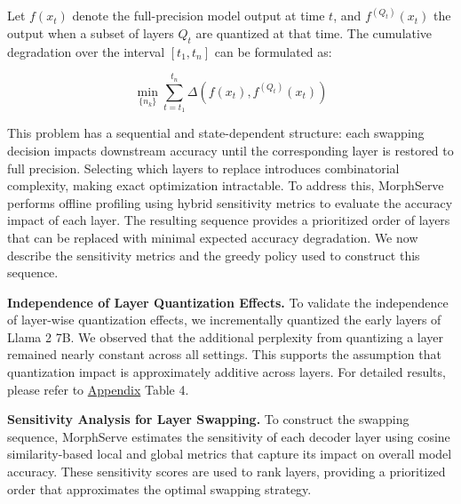 \documentclass{article}
\newcommand{\system}{{MorphServe}\xspace}
\begin{document}
Let $f(x_t)$ denote the full-precision model output at time $t$, and $f^{(Q_t)}(x_t)$ the output when a subset of layers $Q_t$ are quantized at that time. The cumulative degradation over the interval $[t_1, t_n]$ can be formulated as: \vspace{-20pt}

\begin{equation}
\min_{\{n_k\}} \sum_{t = t_1}^{t_n} \Delta(f(x_t), f^{(Q_t)}(x_t))
\label{eq:objective}
\end{equation}

This problem has a sequential and state-dependent structure: each swapping decision impacts downstream accuracy until the corresponding layer is restored to full precision. Selecting which layers to replace introduces combinatorial complexity, making exact optimization intractable. To address this, {\system} performs offline profiling using hybrid sensitivity metrics to evaluate the accuracy impact of each layer. The resulting sequence provides a prioritized order of layers that can be replaced with minimal expected accuracy degradation. We now describe the sensitivity metrics and the greedy policy used to construct this sequence.

\noindent\textbf{Independence of Layer Quantization Effects.}
To validate the independence of layer-wise quantization effects, we incrementally quantized the early layers of Llama 2 7B. We observed that the additional perplexity from quantizing a layer remained nearly constant across all settings. This supports the assumption that quantization impact is approximately additive across layers. For detailed results, please refer to \hyperref[appendix:layer_independence]{Appendix} Table 4.

\noindent\textbf{Sensitivity Analysis for Layer Swapping.}
To construct the swapping sequence, {\system} estimates the sensitivity of each decoder layer using cosine similarity-based local and global metrics that capture its impact on overall model accuracy. These sensitivity scores are used to rank layers, providing a prioritized order that approximates the optimal swapping strategy. \vspace{-5pt}
\end{document}
